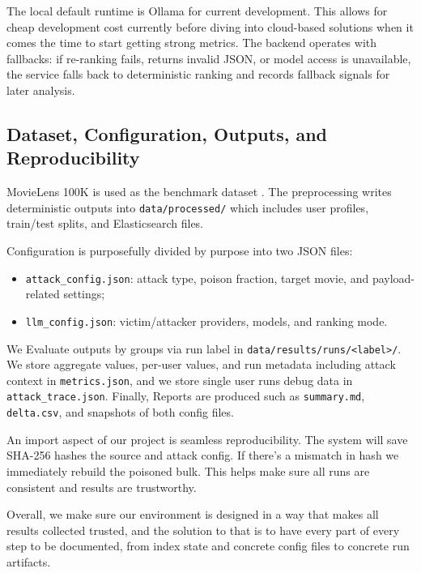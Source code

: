 The local default runtime is Ollama for current development. This allows for cheap development cost currently before diving into cloud-based solutions when it comes the time to start getting strong metrics. The backend operates with fallbacks: if re-ranking fails, returns invalid JSON, or model access is unavailable, the service falls back to deterministic ranking and records fallback signals for later analysis. 

\subsection{Dataset, Configuration, Outputs, and Reproducibility}

MovieLens 100K is used as the benchmark dataset \cite{harper2015movielens}. The preprocessing writes deterministic outputs into \texttt{data/processed/} which includes user profiles, train/test splits, and Elasticsearch files.

Configuration is purposefully divided by purpose into two JSON files:
\begin{itemize}
  \item \texttt{attack\_config.json}: attack type, poison fraction, target movie, and payload-related settings;
  \item \texttt{llm\_config.json}: victim/attacker providers, models, and ranking mode.
\end{itemize}

We Evaluate outputs by groups via run label in \texttt{data/results/runs/<label>/}. We store aggregate values, per-user values, and run metadata including attack context in \texttt{metrics.json}, and we store single user runs debug data in \texttt{attack\_trace.json}. Finally, Reports are produced such as \texttt{summary.md}, \texttt{delta.csv}, and snapshots of both config files.

An import  aspect of our project is seamless reproducibility. The system will save SHA-256 hashes the source and attack config. If there's a mismatch in hash we immediately rebuild the poisoned bulk. This helps make sure all runs are consistent and results are trustworthy.

Overall, we make sure our environment is designed in a way that makes all results collected trusted, and the solution to that is to have every part of every step to be documented, from index state and concrete config files to concrete run artifacts.
